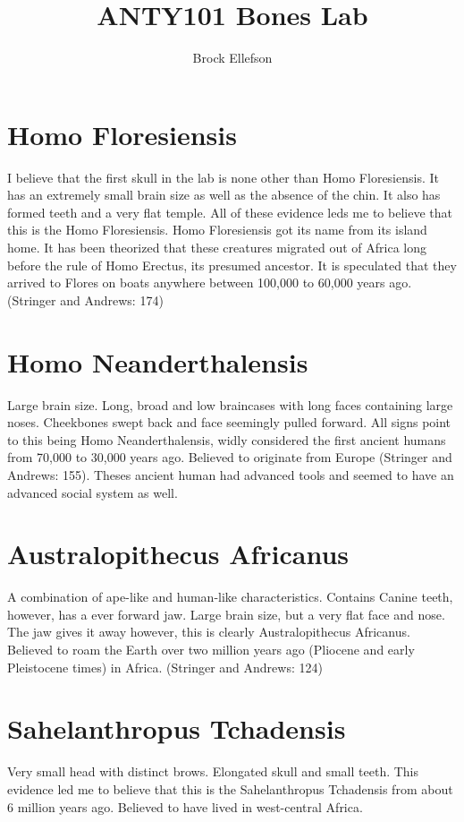 \documentclass[12pt]{article} %
\title{ANTY101 Bones Lab}
\author{Brock Ellefson}
\begin{document}
\maketitle
\section{Homo Floresiensis}
I believe that the first skull in the lab is none other than Homo Floresiensis. It has an extremely small brain size as well as the absence of the chin. It also has formed teeth and a very flat temple. All of these evidence leds me to believe that this is the Homo Floresiensis. Homo Floresiensis got its name from its island home. It has been theorized that these creatures migrated out of Africa long before the rule of Homo Erectus, its presumed ancestor. It is speculated that they arrived to Flores on boats anywhere between 100,000 to 60,000 years ago. (Stringer and Andrews: 174)

\section{Homo Neanderthalensis}
Large brain size. Long, broad and low braincases with long faces containing large noses. Cheekbones swept back and face seemingly pulled forward. All signs point to this being Homo Neanderthalensis, widly considered the first ancient humans from 70,000 to 30,000 years ago. Believed to originate from Europe (Stringer and Andrews: 155). Theses ancient human had advanced tools and seemed to have an advanced social system as well. 

\section{Australopithecus Africanus}
A combination of ape-like and human-like characteristics. Contains Canine teeth, however, has a ever forward jaw. Large brain size, but a very flat face and nose. The jaw gives it away however, this is clearly Australopithecus Africanus. Believed to roam the Earth over two million years ago (Pliocene and early Pleistocene times) in Africa. (Stringer and Andrews: 124)



\section{Sahelanthropus Tchadensis}
Very small head with distinct brows. Elongated skull and small teeth. This evidence led me to believe that this is the Sahelanthropus Tchadensis from about 6 million years ago. Believed to have lived in west-central Africa.
\end{document}
